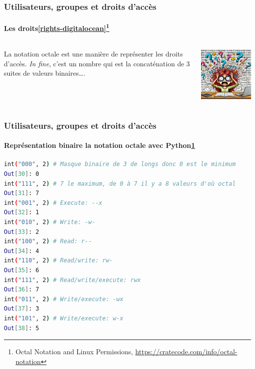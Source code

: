 \documentclass{beamer}
\begin{document}
    \begin{frame}
        \transdissolve
        \frametitle{Utilisateurs, groupes et droits d'accès}
        \framesubtitle{Les droits\cref{rights-digitalocean}\footnotestep\footnote{\label{octal}Octal Notation and Linux Permissions, \url{https://cratecode.com/info/octal-notation}}}
        \begin{columns}
            La notation octale est une manière de représenter les droits d'accès.
            \bigbreak
            \textit{In fine}, c'est un nombre qui est la concaténation de 3 suites de valeurs binaires\ldots.
            \begin{center}
                \includegraphics[width=6.5cm]{image/binary-explosion}
            \end{center}
        \end{columns}
    \end{frame}

    \begin{frame}[fragile]
        \transdissolve
        \frametitle{Utilisateurs, groupes et droits d'accès}
        \framesubtitle{Représentation binaire la notation octale avec Python\cref{octal}}
        \begin{lstlisting}[language=bash]
int("000", 2) # Masque binaire de 3 de longs donc 0 est le minimum
Out[30]: 0
int("111", 2) # 7 le maximum, de 0 à 7 il y a 8 valeurs d'où octal
Out[31]: 7
int("001", 2) # Execute: --x
Out[32]: 1
int("010", 2) # Write: -w-
Out[33]: 2
int("100", 2) # Read: r--
Out[34]: 4
int("110", 2) # Read/write: rw-
Out[35]: 6
int("111", 2) # Read/write/execute: rwx
Out[36]: 7
int("011", 2) # Write/execute: -wx
Out[37]: 3
int("101", 2) # Write/execute: w-x
Out[38]: 5
        \end{lstlisting}
    \end{frame}
\end{document}
